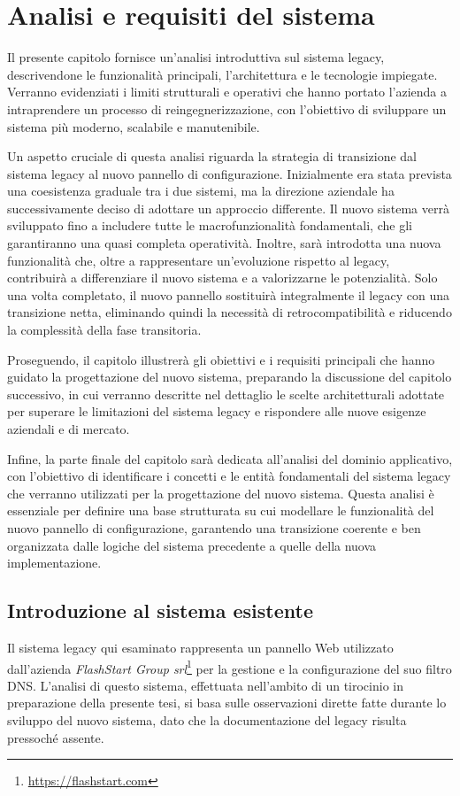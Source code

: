 \chapter{Analisi e requisiti del sistema}
Il presente capitolo fornisce un'analisi introduttiva sul sistema legacy, descrivendone le funzionalità principali, l'architettura e le tecnologie impiegate. Verranno evidenziati i limiti strutturali e operativi che hanno portato l'azienda a intraprendere un processo di reingegnerizzazione, con l'obiettivo di sviluppare un sistema più moderno, scalabile e manutenibile.

Un aspetto cruciale di questa analisi riguarda la strategia di transizione dal sistema legacy al nuovo pannello di configurazione. Inizialmente era stata prevista una coesistenza graduale tra i due sistemi, ma la direzione aziendale ha successivamente deciso di adottare un approccio differente. Il nuovo sistema verrà sviluppato fino a includere tutte le macrofunzionalità fondamentali, che gli garantiranno una quasi completa operatività. Inoltre, sarà introdotta una nuova funzionalità che, oltre a rappresentare un'evoluzione rispetto al legacy, contribuirà a differenziare il nuovo sistema e a valorizzarne le potenzialità.
%
Solo una volta completato, il nuovo pannello sostituirà integralmente il legacy con una transizione netta, eliminando quindi la necessità di retrocompatibilità e riducendo la complessità della fase transitoria.

Proseguendo, il capitolo illustrerà gli obiettivi e i requisiti principali che hanno guidato la progettazione del nuovo sistema, preparando la discussione del capitolo successivo, in cui verranno descritte nel dettaglio le scelte architetturali adottate per superare le limitazioni del sistema legacy e rispondere alle nuove esigenze aziendali e di mercato.

Infine, la parte finale del capitolo sarà dedicata all'analisi del dominio applicativo, con l'obiettivo di identificare i concetti e le entità fondamentali del sistema legacy che verranno utilizzati per la progettazione del nuovo sistema. Questa analisi è essenziale per definire una base strutturata su cui modellare le funzionalità del nuovo pannello di configurazione, garantendo una transizione coerente e ben organizzata dalle logiche del sistema precedente a quelle della nuova implementazione.

\section{Introduzione al sistema esistente}
Il sistema legacy qui esaminato rappresenta un pannello Web utilizzato dall'azienda \textit{FlashStart Group srl}\footnote{\url{https://flashstart.com}} per la gestione e la configurazione del suo filtro DNS. L’analisi di questo sistema, effettuata nell’ambito di un tirocinio in preparazione della presente tesi, si basa sulle osservazioni dirette fatte durante lo sviluppo del nuovo sistema, dato che la documentazione del legacy risulta pressoché assente.


